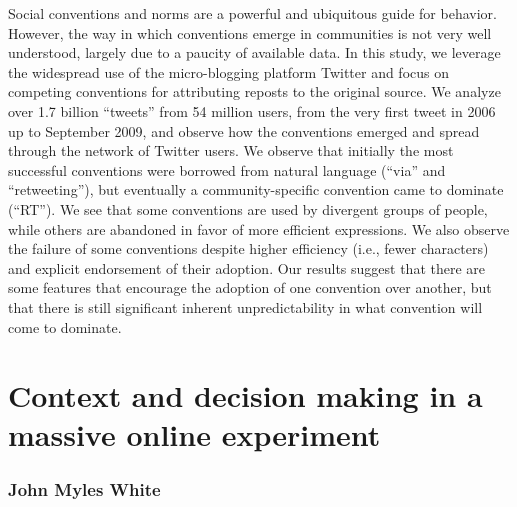 \documentclass[10pt,letterpaper]{article}
\begin{document}
Social conventions and norms are a powerful and ubiquitous guide for behavior.
However, the way in which conventions emerge in communities is not very well
understood, largely due to a paucity of available data.  In this study, we
leverage the widespread use of the micro-blogging platform Twitter and focus on
competing conventions for attributing reposts to the original source.  We analyze
over 1.7 billion ``tweets'' from 54 million users, from the very first tweet in
2006 up to September 2009, and observe how the conventions emerged and spread
through the network of Twitter users.  We observe that initially the most
successful conventions were borrowed from natural language (``via'' and
``retweeting''), but eventually a community-specific convention came to dominate
(``RT'').  We see that some conventions are used by divergent groups of people,
while others are abandoned in favor of more efficient expressions.  We also
observe the failure of some conventions despite higher efficiency (i.e., fewer
characters) and explicit endorsement of their adoption.  Our results suggest that
there are some features that encourage the adoption of one convention over
another, but that there is still significant inherent unpredictability in what
convention will come to dominate.

\section{Context and decision making in a massive online experiment}
\subsubsection{John Myles White}
\end{document}
